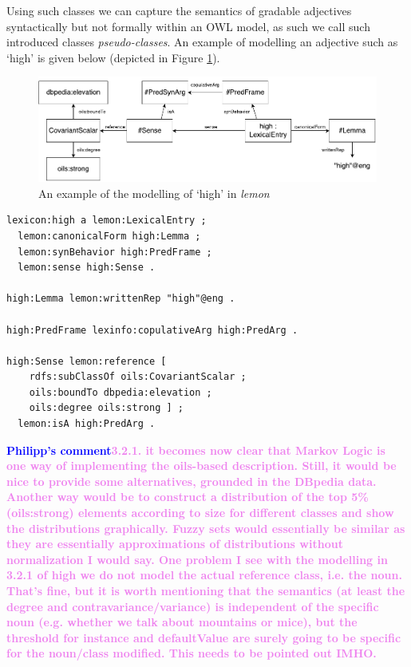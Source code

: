 \documentclass[11pt]{article}
\begin{document}
Using such classes we can capture the semantics of gradable adjectives 
syntactically but not formally within an OWL model, as such we call such 
introduced classes \emph{pseudo-classes}. An example of modelling an adjective 
such as `high' is given below (depicted in Figure \ref{high-example}).

\begin{figure}
\includegraphics[width=\textwidth]{high-example}
\caption{An example of the modelling of `high' in \emph{lemon}\label{high-example}}
\end{figure}

\begin{verbatim}
lexicon:high a lemon:LexicalEntry ;
  lemon:canonicalForm high:Lemma ;
  lemon:synBehavior high:PredFrame ;
  lemon:sense high:Sense .

high:Lemma lemon:writtenRep "high"@eng .

high:PredFrame lexinfo:copulativeArg high:PredArg .

high:Sense lemon:reference [
    rdfs:subClassOf oils:CovariantScalar ;
    oils:boundTo dbpedia:elevation ;
    oils:degree oils:strong ] ;
  lemon:isA high:PredArg .
\end{verbatim}

\textbf{\textcolor{blue}{Philipp's comment}\textcolor{violet}{3.2.1. it becomes now clear that Markov Logic is one way of implementing the oils-based description.
Still, it would be nice to provide some alternatives, grounded in the DBpedia data. Another way would be to construct a distribution of the top 5\% (oils:strong) elements according to size for different classes and show the distributions graphically. Fuzzy sets would essentially be similar as they are essentially approximations of distributions without normalization I would say.
One problem I see with the modelling in 3.2.1 of high we do not model the actual reference class, i.e. the noun. That's fine, but it is worth mentioning that the semantics (at least the degree and contravariance/variance) is independent of the specific noun (e.g. whether we talk about mountains or mice), but the threshold for instance and defaultValue are surely going to be specific for the noun/class modified. This needs to be pointed out IMHO.}}
\end{document}
